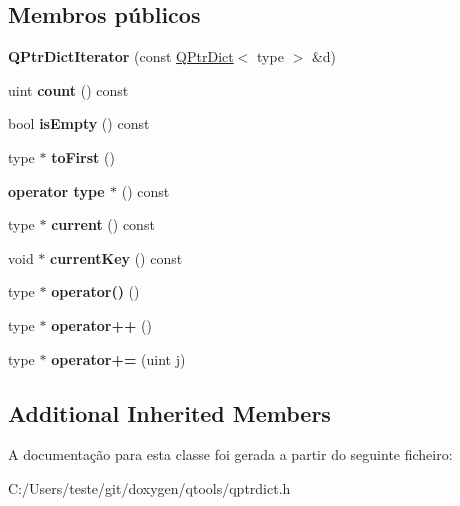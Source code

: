 \subsection*{Membros públicos}
\begin{DoxyCompactItemize}
\item 
\hypertarget{class_q_ptr_dict_iterator_a5a0b66b944f31c0f3068e0478badd811}{{\bfseries Q\-Ptr\-Dict\-Iterator} (const \hyperlink{class_q_ptr_dict}{Q\-Ptr\-Dict}$<$ type $>$ \&d)}\label{class_q_ptr_dict_iterator_a5a0b66b944f31c0f3068e0478badd811}

\item 
\hypertarget{class_q_ptr_dict_iterator_a774149fc271ebaba2aabcd183a836e8f}{uint {\bfseries count} () const }\label{class_q_ptr_dict_iterator_a774149fc271ebaba2aabcd183a836e8f}

\item 
\hypertarget{class_q_ptr_dict_iterator_a479432127ee77145cc19d6a2d1590821}{bool {\bfseries is\-Empty} () const }\label{class_q_ptr_dict_iterator_a479432127ee77145cc19d6a2d1590821}

\item 
\hypertarget{class_q_ptr_dict_iterator_a7e3cadfe5d178fc4db2e97112af20024}{type $\ast$ {\bfseries to\-First} ()}\label{class_q_ptr_dict_iterator_a7e3cadfe5d178fc4db2e97112af20024}

\item 
\hypertarget{class_q_ptr_dict_iterator_a2e144510e7eb044f9d96660f6590a589}{{\bfseries operator type $\ast$} () const }\label{class_q_ptr_dict_iterator_a2e144510e7eb044f9d96660f6590a589}

\item 
\hypertarget{class_q_ptr_dict_iterator_ac22b90cda8a81fe45ae121578fcf9726}{type $\ast$ {\bfseries current} () const }\label{class_q_ptr_dict_iterator_ac22b90cda8a81fe45ae121578fcf9726}

\item 
\hypertarget{class_q_ptr_dict_iterator_a1cd5fbf8933fdb128121cdeb75f5a7c4}{void $\ast$ {\bfseries current\-Key} () const }\label{class_q_ptr_dict_iterator_a1cd5fbf8933fdb128121cdeb75f5a7c4}

\item 
\hypertarget{class_q_ptr_dict_iterator_a53bb20f7dd4f90cc047f999b7dec5fe0}{type $\ast$ {\bfseries operator()} ()}\label{class_q_ptr_dict_iterator_a53bb20f7dd4f90cc047f999b7dec5fe0}

\item 
\hypertarget{class_q_ptr_dict_iterator_a60e0a5b2a616525ebaec6c235b066c3e}{type $\ast$ {\bfseries operator++} ()}\label{class_q_ptr_dict_iterator_a60e0a5b2a616525ebaec6c235b066c3e}

\item 
\hypertarget{class_q_ptr_dict_iterator_a689beef631dff5b294c16f1246e6c230}{type $\ast$ {\bfseries operator+=} (uint j)}\label{class_q_ptr_dict_iterator_a689beef631dff5b294c16f1246e6c230}

\end{DoxyCompactItemize}
\subsection*{Additional Inherited Members}


A documentação para esta classe foi gerada a partir do seguinte ficheiro\-:\begin{DoxyCompactItemize}
\item 
C\-:/\-Users/teste/git/doxygen/qtools/qptrdict.\-h\end{DoxyCompactItemize}

